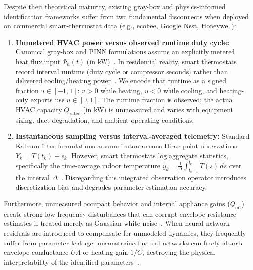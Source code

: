 \documentclass[11pt,letterpaper]{article}
\begin{document}
Despite their theoretical maturity, existing gray-box and physics-informed identification frameworks suffer from two fundamental disconnects when deployed on commercial smart-thermostat data (e.g., ecobee, Google Nest, Honeywell):
\begin{enumerate}
\item \textbf{Unmetered HVAC power versus observed runtime duty cycle:} Canonical gray-box and PINN formulations assume an explicitly metered heat flux input $\Phi_h(t)$ (in kW)~\cite{madsen1995,kristensen2004,gokhale2022}. In residential reality, smart thermostats record interval runtime (duty cycle or compressor seconds) rather than delivered cooling/heating power~\cite{huchuk2021}. We encode that runtime as a signed fraction $u \in [-1, 1]$: $u>0$ while heating, $u<0$ while cooling, and heating-only exports use $u \in [0, 1]$. The runtime fraction is observed; the actual HVAC capacity $Q_\mathrm{rated}$ (in kW) is unmeasured and varies with equipment sizing, duct degradation, and ambient operating conditions.
\item \textbf{Instantaneous sampling versus interval-averaged telemetry:} Standard Kalman filter formulations assume instantaneous Dirac point observations $Y_k = T(t_k) + e_k$. However, smart thermostats log aggregate statistics, specifically the time-average indoor temperature $\bar{y}_k = \frac{1}{\Delta}\int_{t_{k-1}}^{t_k} T(s)\,ds$ over the interval $\Delta$~\cite{huchuk2021}. Disregarding this integrated observation operator introduces discretization bias and degrades parameter estimation accuracy.
\end{enumerate}

Furthermore, unmeasured occupant behavior and internal appliance gains ($Q_\mathrm{int}$) create strong low-frequency disturbances that can corrupt envelope resistance estimates if treated merely as Gaussian white noise~\cite{rouchier2018}. When neural network residuals are introduced to compensate for unmodeled dynamics, they frequently suffer from parameter leakage: unconstrained neural networks can freely absorb envelope conductance $UA$ or heating gain $1/C$, destroying the physical interpretability of the identified parameters~\cite{dinatale2022}.
\end{document}
